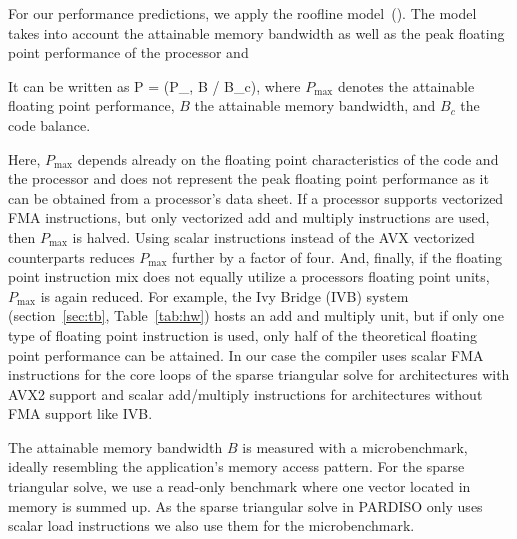For our performance predictions, we apply the roofline model~(\cite{williams-2009}).
The model takes into account the attainable memory bandwidth as well as 
the
peak floating
point performance of the processor and 

It can be written as
%
\be
  P = \min(P_, B / B_c),
\ee
where $P_\text{max}$ denotes the attainable floating point performance, $B$ the
attainable memory bandwidth, and $B_c$ the code balance.

Here, $P_\text{max}$
depends already on the floating point characteristics of the code and the
processor and does not represent the peak floating point performance as it can
be obtained from a processor's data sheet. 
If a processor supports vectorized FMA instructions, but
only vectorized add and multiply instructions are used, then $P_\text{max}$ is
halved.
Using scalar instructions instead of the AVX vectorized counterparts reduces
$P_\text{max}$ further by a factor of four.
%
And, finally, if the floating point instruction mix does not equally utilize a
processors floating point units, $P_\text{max}$ is again reduced.
For example, the Ivy Bridge (IVB) system (section~\ref{sec:tb}, Table~\ref{tab:hw}) hosts an add and
multiply unit, but if only one type of floating point instruction is used, only
half of the theoretical floating
point performance can be attained. 
%
In our case the compiler uses 
scalar FMA instructions
for the core loops of the %
sparse triangular solve
for architectures
with AVX2 support and scalar add/multiply instructions for
architectures without FMA support like IVB.

The attainable memory bandwidth $B$ is measured with a microbenchmark,
ideally resembling the application's memory access pattern. 
For the
sparse triangular solve,
we use a read-only benchmark where one
vector located in memory is summed up.
%
As the sparse triangular solve
in PARDISO only uses scalar load instructions we also use them
for the microbenchmark. 

